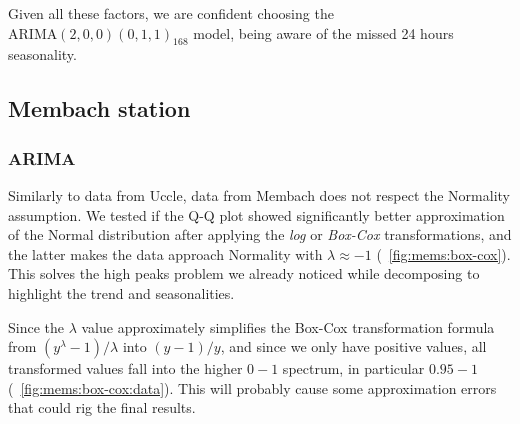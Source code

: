 \documentclass[12pt]{article}
\begin{document}

Given all these factors, we are confident choosing the $\mathrm{ARIMA}(2,0,0)(0,1,1)_{168}$ model, being aware of the missed 24 hours seasonality.


\subsection{Membach station}
\subsubsection{ARIMA}
Similarly to data from Uccle, data from Membach does not respect the Normality assumption. We tested if the Q-Q plot showed significantly better approximation of the Normal distribution after applying the \textit{log} or \textit{Box-Cox} transformations, and the latter makes the data approach Normality with $\lambda\approx-1$ (\figurename~\ref{fig:mems:box-cox}). This solves the high peaks problem we already noticed while decomposing to highlight the trend and seasonalities.

Since the $\lambda$ value approximately simplifies the Box-Cox transformation formula from $(y^\lambda-1)/\lambda$ into $(y-1)/y$, and since we only have positive values, all transformed values fall into the higher $0-1$ spectrum, in particular $0.95-1$ (\figurename~\ref{fig:mems:box-cox:data}). This will probably cause some approximation errors that could rig the final results.
\end{document}
